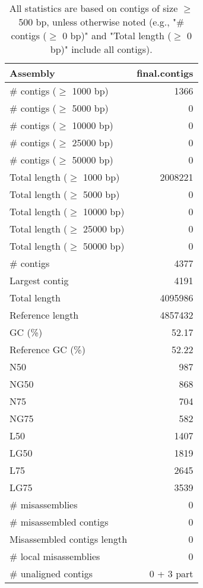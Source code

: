 \documentclass[12pt,a4paper]{article}
\begin{document}
\begin{table}[ht]
\begin{center}
\caption{All statistics are based on contigs of size $\geq$ 500 bp, unless otherwise noted (e.g., "\# contigs ($\geq$ 0 bp)" and "Total length ($\geq$ 0 bp)" include all contigs).}
\begin{tabular}{|l*{1}{|r}|}
\hline
Assembly & final.contigs \\ \hline
\# contigs ($\geq$ 1000 bp) & 1366 \\ \hline
\# contigs ($\geq$ 5000 bp) & 0 \\ \hline
\# contigs ($\geq$ 10000 bp) & 0 \\ \hline
\# contigs ($\geq$ 25000 bp) & 0 \\ \hline
\# contigs ($\geq$ 50000 bp) & 0 \\ \hline
Total length ($\geq$ 1000 bp) & 2008221 \\ \hline
Total length ($\geq$ 5000 bp) & 0 \\ \hline
Total length ($\geq$ 10000 bp) & 0 \\ \hline
Total length ($\geq$ 25000 bp) & 0 \\ \hline
Total length ($\geq$ 50000 bp) & 0 \\ \hline
\# contigs & 4377 \\ \hline
Largest contig & 4191 \\ \hline
Total length & 4095986 \\ \hline
Reference length & 4857432 \\ \hline
GC (\%) & 52.17 \\ \hline
Reference GC (\%) & 52.22 \\ \hline
N50 & 987 \\ \hline
NG50 & 868 \\ \hline
N75 & 704 \\ \hline
NG75 & 582 \\ \hline
L50 & 1407 \\ \hline
LG50 & 1819 \\ \hline
L75 & 2645 \\ \hline
LG75 & 3539 \\ \hline
\# misassemblies & 0 \\ \hline
\# misassembled contigs & 0 \\ \hline
Misassembled contigs length & 0 \\ \hline
\# local misassemblies & 0 \\ \hline
\# unaligned contigs & 0 + 3 part \\ \hline

\end{tabular}
\end{center}
\end{table}
\end{document}
